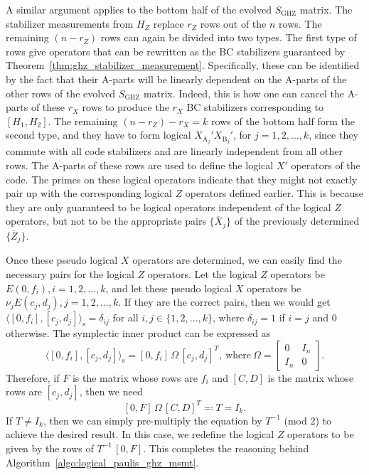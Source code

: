 \documentclass[journal,onecolumn]{IEEEtran}
\newcommand{\syminn}[2]{\langle #1, #2 \rangle_{\text{s}}}
\begin{document}
A similar argument applies to the bottom half of the evolved $S_{\text{GHZ}}$ matrix.
The stabilizer measurements from $H_Z$ replace $r_Z$ rows out of the $n$ rows.
The remaining $(n-r_Z)$ rows can again be divided into two types.
The first type of rows give operators that can be rewritten as the BC stabilizers guaranteed by Theorem~\ref{thm:ghz_stabilizer_measurement}.
Specifically, these can be identified by the fact that their A-parts will be linearly dependent on the A-parts of the other rows of the evolved $S_{\text{GHZ}}$ matrix.
Indeed, this is how one can cancel the A-parts of these $r_X$ rows to produce the $r_X$ BC stabilizers corresponding to $[H_1,H_2]$.
The remaining $(n-r_Z)-r_X = k$ rows of the bottom half form the second type, and they have to form logical $X_{\text{A}_j}' X_{\text{B}_j}'$, for $j=1,2,\ldots,k$, since they commute with all code stabilizers and are linearly independent from all other rows.
The A-parts of these rows are used to define the logical $X'$ operators of the code.
The primes on these logical operators indicate that they might not exactly pair up with the corresponding logical $Z$ operators defined earlier.
This is because they are only guaranteed to be logical operators independent of the logical $Z$ operators, but not to be the appropriate pairs $\{ \overline{X}_j \}$ of the previously determined $\{ \overline{Z}_j \}$.

Once these pseudo logical $X$ operators are determined, we can easily find the necessary pairs for the logical $Z$ operators.
Let the logical $Z$ operators be $E(0,f_i), i = 1,2,\ldots,k$, and let these pseudo logical $X$ operators be $\nu_j E(c_j,d_j), j = 1,2,\ldots,k$.
If they are the correct pairs, then we would get $\syminn{[0,f_i]}{[c_j,d_j]} = \delta_{ij}$ for all $i,j \in \{ 1,2,\ldots,k \}$, where $\delta_{ij} = 1$ if $i=j$ and $0$ otherwise.
The symplectic inner product can be expressed as 
$$ \syminn{[0,f_i]}{[c_j,d_j]} = [0,f_i] \, \Omega \, [c_j,d_j]^T,\ \text{where}\ \Omega = \begin{bmatrix} 0 & I_n \\ I_n & 0 \end{bmatrix}. $$
Therefore, if $F$ is the matrix whose rows are $f_i$ and $[C,D]$ is the matrix whose rows are $[c_j,d_j]$, then we need 
$$ [0,F] \, \Omega \, [C,D]^T \eqqcolon T = I_k. $$
If $T \neq I_k$, then we can simply pre-multiply the equation by $T^{-1}$ (mod $2$) to achieve the desired result.
In this case, we redefine the logical $Z$ operators to be given by the rows of $T^{-1}\, [0,F]$.
This completes the reasoning behind Algorithm~\ref{algo:logical_paulis_ghz_msmt}.


 
\end{document}
